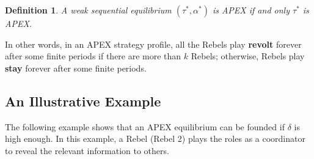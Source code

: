 \documentclass[12pt,letter]{article}
\newtheorem{definition}{Definition}[section]
\theoremstyle{definition}
\theoremstyle{remark}
\theoremstyle{claim}
\begin{document}
\begin{definition}\label{Def_expost_efficient}
A weak sequential equilibrium $(\tau^{*},\alpha^{*})$ is APEX if and only $\tau^{*}$ is APEX.
\end{definition}




In other words, in an APEX strategy profile, all the Rebels play \textbf{revolt} forever after some finite periods if there are more than $k$ Rebels; otherwise, Rebels play \textbf{stay} forever after some finite periods. 


 \subsection{An Illustrative Example}


The following example shows that an APEX equilibrium can be founded if $\delta$ is high enough. In this example, a Rebel (Rebel 2) plays the roles as a coordinator to reveal the relevant information to others.
\end{document}
